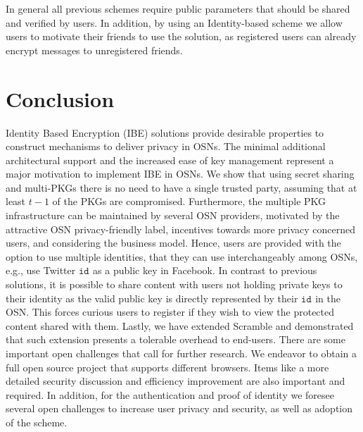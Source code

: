 \documentclass[journal]{IEEEtran}
\newcommand{\id}[1]{\ensuremath{\mathtt{id}_{#1}}}
\begin{document}
In general all previous schemes require public parameters that should be shared and verified by users. In addition, by using an Identity-based scheme we allow users to motivate their friends to use the solution, as registered users can already encrypt messages to unregistered friends.



\section{Conclusion}\label{sec:conc}

Identity Based Encryption (IBE) solutions provide desirable properties to construct mechanisms to deliver privacy in OSNs. The minimal
additional architectural support and the increased ease of key management represent a major motivation to implement IBE in OSNs. We show that using secret sharing and multi-PKGs there is no need to have a single trusted party, assuming that at least $t-1$ of the PKGs are compromised. 
Furthermore, the multiple PKG infrastructure can be maintained by several OSN providers, motivated by the attractive OSN privacy-friendly label, incentives towards more privacy concerned users, and considering the business model. 
Hence, users are provided with the option to use multiple identities, that they can use interchangeably among OSNs, e.g., use Twitter \id{} as a public key in Facebook. 
In contrast to previous solutions, it is possible to share content with users not holding private keys to their identity as the valid public key is directly represented by their \id{} in the OSN. This forces curious users to register if they wish to view the protected content shared with them.
Lastly, we have extended Scramble and demonstrated that such extension presents a tolerable overhead to end-users. 
There are some important open challenges that call for further research. We endeavor to obtain a full open source project that supports different browsers. Items like a more detailed security discussion and efficiency improvement are also important and required. In addition, for the authentication and proof of identity we foresee several open challenges to increase user privacy and security, as well as adoption of the scheme.
\end{document}
